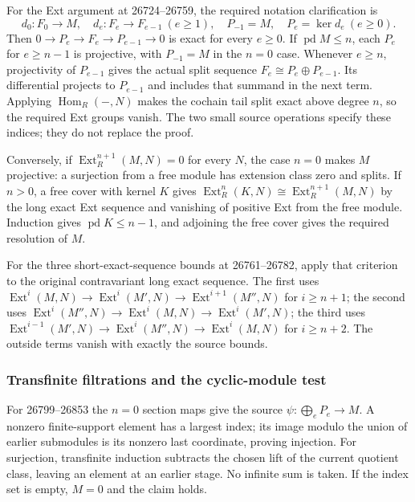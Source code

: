 For the Ext argument at 26724--26759, the required notation clarification is \[
d_0:F_0\to M,\quad d_e:F_e\to F_{e-1}\ (e\ge1),\quad
P_{-1}=M,\quad P_e=\ker d_e\ (e\ge0).
\] Then \(0\to P_e\to F_e\to P_{e-1}\to0\) is exact for every \(e\ge0\). If \(\operatorname{pd}M\le n\), each \(P_e\) for \(e\ge n-1\) is projective, with \(P_{-1}=M\) in the \(n=0\) case. Whenever \(e\ge n\), projectivity of \(P_{e-1}\) gives the actual split sequence \(F_e\cong P_e\oplus P_{e-1}\). Its differential projects to \(P_{e-1}\) and includes that summand in the next term. Applying \(\operatorname{Hom}_R(-,N)\) makes the cochain tail split exact above degree \(n\), so the required Ext groups vanish. The two small source operations specify these indices; they do not replace the proof.

Conversely, if \(\operatorname{Ext}^{n+1}_R(M,N)=0\) for every \(N\), the case \(n=0\) makes \(M\) projective: a surjection from a free module has extension class zero and splits. If \(n>0\), a free cover with kernel \(K\) gives \(\operatorname{Ext}^n_R(K,N)\cong\operatorname{Ext}^{n+1}_R(M,N)\) by the long exact Ext sequence and vanishing of positive Ext from the free module. Induction gives \(\operatorname{pd}K\le n-1\), and adjoining the free cover gives the required resolution of \(M\).

For the three short-exact-sequence bounds at 26761--26782, apply that criterion to the original contravariant long exact sequence. The first uses \(\operatorname{Ext}^i(M,N)\to\operatorname{Ext}^i(M',N)\to\operatorname{Ext}^{i+1}(M'',N)\) for \(i\ge n+1\); the second uses \(\operatorname{Ext}^i(M'',N)\to\operatorname{Ext}^i(M,N)\to\operatorname{Ext}^i(M',N)\); the third uses \(\operatorname{Ext}^{i-1}(M',N)\to\operatorname{Ext}^i(M'',N)\to\operatorname{Ext}^i(M,N)\) for \(i\ge n+2\). The outside terms vanish with exactly the source bounds.

\subsubsection{Transfinite filtrations and the cyclic-module test}\label{algebra-proof-022-transfinite-filtrations-and-the-cyclic-module-test}

For 26799--26853 the \(n=0\) section maps give the source \(\psi:\bigoplus_eP_e\to M\). A nonzero finite-support element has a largest index; its image modulo the union of earlier submodules is its nonzero last coordinate, proving injection. For surjection, transfinite induction subtracts the chosen lift of the current quotient class, leaving an element at an earlier stage. No infinite sum is taken. If the index set is empty, \(M=0\) and the claim holds.

